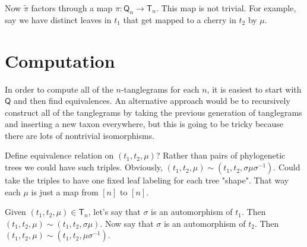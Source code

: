 \documentclass{amsart}
\newcommand{\match}{\mu}
\newcommand{\tangle}{\mathsf{T}}
\newcommand{\stpair}{\mathsf{Q}}  %
\newcommand{\bigproj}{\tilde \pi}
\newcommand{\proj}{\pi}
\begin{document}
Now $\bigproj$ factors through a map $\proj: \stpair_n \rightarrow \tangle_n$.
This map is not trivial.
For example, say we have distinct leaves in $t_1$ that get mapped to a cherry in $t_2$ by $\match$.


\section{Computation}

In order to compute all of the $n$-tanglegrams for each $n$, it is easiest to start with $\stpair$ and then find equivalences.
An alternative approach would be to recursively construct all of the tanglegrams by taking the previous generation of tanglegrams and inserting a new taxon everywhere, but this is going to be tricky because there are lots of nontrivial isomorphisms.

Define equivalence relation on $(t_1, t_2, \match)$?
Rather than pairs of phylogenetic trees we could have such triples.
Obviously, $(t_1, t_2, \match) \sim (t_1, t_2, \sigma \match \sigma^{-1})$.
Could take the triples to have one fixed leaf labeling for each tree "shape".
That way each $\match$ is just a map from $[n]$ to $[n]$.

Given $(t_1, t_2, \match) \in \tangle_n$, let's say that $\sigma$ is an automorphism of $t_1$.
Then $(t_1, t_2, \match) \sim (t_1, t_2, \sigma \match)$.
Now say that $\sigma$ is an automorphism of $t_2$.
Then $(t_1, t_2, \match) \sim (t_1, t_2, \match \sigma^{-1})$.



% 
% 
\end{document}
